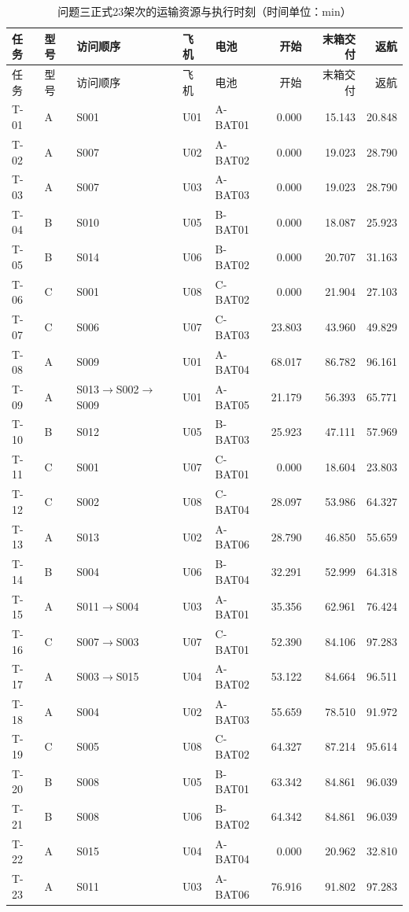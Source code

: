 \begingroup\small\setlength{\tabcolsep}{3pt}
\begin{longtable}{llp{2.9cm}llrrr}
\caption{问题三正式23架次的运输资源与执行时刻（时间单位：min）}\label{tab:q3_full_schedule}\\
\toprule 任务 & 型号 & 访问顺序 & 飞机 & 电池 & 开始 & 末箱交付 & 返航\\\midrule
\endfirsthead
\toprule 任务 & 型号 & 访问顺序 & 飞机 & 电池 & 开始 & 末箱交付 & 返航\\\midrule
\endhead
T-01 & A & S001 & U01 & A-BAT01 & 0.000 & 15.143 & 20.848\\
T-02 & A & S007 & U02 & A-BAT02 & 0.000 & 19.023 & 28.790\\
T-03 & A & S007 & U03 & A-BAT03 & 0.000 & 19.023 & 28.790\\
T-04 & B & S010 & U05 & B-BAT01 & 0.000 & 18.087 & 25.923\\
T-05 & B & S014 & U06 & B-BAT02 & 0.000 & 20.707 & 31.163\\
T-06 & C & S001 & U08 & C-BAT02 & 0.000 & 21.904 & 27.103\\
T-07 & C & S006 & U07 & C-BAT03 & 23.803 & 43.960 & 49.829\\
T-08 & A & S009 & U01 & A-BAT04 & 68.017 & 86.782 & 96.161\\
T-09 & A & S013$\to$S002$\to$S009 & U01 & A-BAT05 & 21.179 & 56.393 & 65.771\\
T-10 & B & S012 & U05 & B-BAT03 & 25.923 & 47.111 & 57.969\\
T-11 & C & S001 & U07 & C-BAT01 & 0.000 & 18.604 & 23.803\\
T-12 & C & S002 & U08 & C-BAT04 & 28.097 & 53.986 & 64.327\\
T-13 & A & S013 & U02 & A-BAT06 & 28.790 & 46.850 & 55.659\\
T-14 & B & S004 & U06 & B-BAT04 & 32.291 & 52.999 & 64.318\\
T-15 & A & S011$\to$S004 & U03 & A-BAT01 & 35.356 & 62.961 & 76.424\\
T-16 & C & S007$\to$S003 & U07 & C-BAT01 & 52.390 & 84.106 & 97.283\\
T-17 & A & S003$\to$S015 & U04 & A-BAT02 & 53.122 & 84.664 & 96.511\\
T-18 & A & S004 & U02 & A-BAT03 & 55.659 & 78.510 & 91.972\\
T-19 & C & S005 & U08 & C-BAT02 & 64.327 & 87.214 & 95.614\\
T-20 & B & S008 & U05 & B-BAT01 & 63.342 & 84.861 & 96.039\\
T-21 & B & S008 & U06 & B-BAT02 & 64.342 & 84.861 & 96.039\\
T-22 & A & S015 & U04 & A-BAT04 & 0.000 & 20.962 & 32.810\\
T-23 & A & S011 & U03 & A-BAT06 & 76.916 & 91.802 & 97.283\\
\bottomrule\end{longtable}
\endgroup
